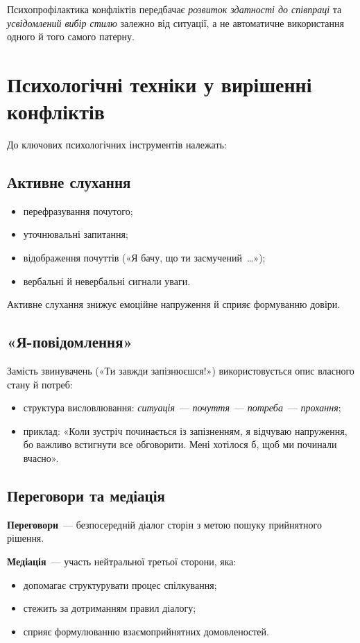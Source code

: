 \documentclass[12pt,a4paper]{article}
\begin{document}
    Психопрофілактика конфліктів передбачає \textit{розвиток здатності до співпраці} та \textit{усвідомлений вибір стилю} 
    залежно від ситуації, а не автоматичне використання одного й того самого патерну.

    \section*{Психологічні техніки у вирішенні конфліктів}
    До ключових психологічних інструментів належать:

    \subsection*{Активне слухання}
    \begin{itemize}
        \item перефразування почутого;
        \item уточнювальні запитання;
        \item відображення почуттів («Я бачу, що ти засмучений~\ldots»);
        \item вербальні й невербальні сигнали уваги.
    \end{itemize}
    Активне слухання знижує емоційне напруження й сприяє формуванню довіри.

    \subsection*{«Я-повідомлення»}
    Замість звинувачень («Ти завжди запізнюєшся!») використовується опис власного стану й потреб:
    \begin{itemize}
        \item структура висловлювання: \textit{ситуація}~--- \textit{почуття}~--- \textit{потреба}~--- \textit{прохання};
        \item приклад: «Коли зустріч починається із запізненням, я відчуваю напруження, 
        бо важливо встигнути все обговорити. Мені хотілося б, щоб ми починали вчасно».
    \end{itemize}

    \subsection*{Переговори та медіація}
    \textbf{Переговори}~--- безпосередній діалог сторін з метою пошуку прийнятного рішення.

    \textbf{Медіація}~--- участь нейтральної третьої сторони, яка:
    \begin{itemize}
        \item допомагає структурувати процес спілкування;
        \item стежить за дотриманням правил діалогу;
        \item сприяє формулюванню взаємоприйнятних домовленостей.
    \end{itemize}
\end{document}
